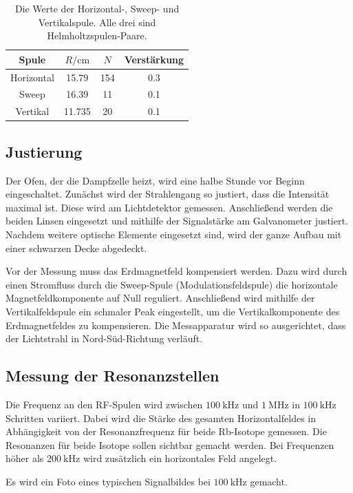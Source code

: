 \begin{table}\caption{Die Werte der Horizontal-, Sweep- und Vertikalspule. Alle drei sind Helmholtzspulen-Paare.}
    \label{tab:spule}
    \centering
    \begin{tabular}{c | S[] S[] S[]} 
    \toprule
    {Spule} & {$R / \si{\centi\metre}$} & {$N$} & {Verstärkung} \\
    \midrule
    Horizontal & 15.79 & 154 & 0.3 \\
    Sweep & 16.39 & 11 & 0.1 \\ 
    Vertikal & 11.735 & 20 & 0.1 \\ 
    \bottomrule
\end{tabular}\end{table}


\subsection{Justierung}
Der Ofen, der die Dampfzelle heizt, wird eine halbe Stunde vor Beginn eingeschaltet.
Zunächst wird der Strahlengang so justiert, dass die Intensität maximal ist. Diese wird am Lichtdetektor gemessen.
Anschließend werden die beiden Linsen eingesetzt und mithilfe der Signalstärke am Galvanometer justiert.
Nachdem weitere optische Elemente eingesetzt sind, wird der ganze Aufbau mit einer schwarzen Decke abgedeckt. \cite{V21}

Vor der Messung muss das Erdmagnetfeld kompensiert werden.
Dazu wird durch einen Stromfluss durch die Sweep-Spule (Modulationsfeldspule) die horizontale Magnetfeldkomponente auf Null reguliert. Anschließend wird mithilfe der Vertikalfeldspule ein schmaler Peak eingestellt, um die Vertikalkomponente des Erdmagnetfeldes zu kompensieren. Die Messapparatur wird so ausgerichtet, dass der Lichtstrahl in Nord-Süd-Richtung verläuft. \cite{V21}

\subsection{Messung der Resonanzstellen}

Die Frequenz an den RF-Spulen wird zwischen $\SI{100}{\kilo\hertz}$ und $\SI{1}{\mega\hertz}$ in $\SI{100}{\kilo\hertz}$ Schritten variiert. Dabei wird die Stärke des gesamten Horizontalfeldes in Abhängigkeit von der Resonanzfrequenz für beide Rb-Isotope gemessen. Die Resonanzen für beide Isotope sollen sichtbar gemacht werden. Bei Frequenzen höher als $\SI{200}{\kilo\hertz}$ wird zusätzlich ein horizontales Feld angelegt.

Es wird ein Foto eines typischen Signalbildes bei $\SI{100}{\kilo\hertz}$ gemacht.